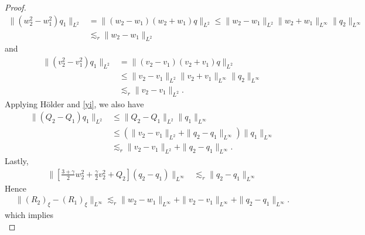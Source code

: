 \documentclass[12pt,reqno]{amsart}
\numberwithin{equation}{section}  %
\numberwithin{figure}{section}
\begin{document}
\begin{proof}
%
%
%
\begin{equation*}
\begin{split}
  \| (w_{2}^{2} - w_{1}^{2})q_{1} \|_{L^{2}}
  & = \| (w_{2} - w_{1})(w_{2} + w_{1})q \|_{L^{2}} \le \| w_{2} - w_{1} \|_{L^{2}} 
  \| w_{2} + w_{1} \|_{L^{\infty}} \| q_{2} \|_{L^{\infty}}
  \\
  & \lesssim_{r} \| w_{2} - w_{1} \|_{L^{2}}
\end{split}
\end{equation*}
%
%
and 
%
\begin{equation*}
\begin{split}
  \| (v_{2}^{2} - v_{1}^{2})q_{1} \|_{L^{2}}
  & = \| (v_{2} - v_{1})(v_{2} + v_{1})q \|_{L^{2}}
  \\
  & \le \| v_{2} - v_{1} \|_{L^{2}} 
  \| v_{2} + v_{1} \|_{L^{\infty}} \| q_{2} \|_{L^{\infty}}
  \\
  & \lesssim_{r} \| v_{2} - v_{1} \|_{L^{2}}.
\end{split}
\end{equation*}
Applying H\"older and \eqref{yi}, we also have
%
%
%
\begin{equation*}
\begin{split}
  \| (Q_{2} - Q_{1})q_{1} \|_{L^{2}} 
  & \le \| Q_{2} - Q_{1} \|_{L^{2}} \| q_{1} \|_{L^{\infty}}
  \\
  & \le (\| v_{2} - v_{1} \|_{L^{2}} + \| q_{2} - q_{1} \|_{L^{\infty}})\| q_{1} \|_{L^{\infty}}
  \\
  & \lesssim_{r} \| v_{2} - v_{1} \|_{L^{2}} + \| q_{2} - q_{1} \|_{L^{\infty}}.
\end{split}
\end{equation*}
%
%
Lastly,
%
\begin{equation*}
\begin{split}
 \| \left[
  \frac{3 + \gamma}{2} w_{2}^{2} + \frac{\gamma}{2}v_{2}^{2} + Q_{2}
  \right](q_{2} - q_{1}) \|_{L^{\infty}}
  & \lesssim_{r} \| q_{2} - q_{1} \|_{L^{\infty}} 
\end{split}
\end{equation*}
%
%
Hence
%
%
\begin{equation*}
\begin{split}
  \| (R_{2})_{\xi} - (R_{1})_{\xi} \|_{L^{\infty}} \lesssim_{r} \| w_{2} - w_{1} \|_{L^{\infty}} + \| v_{2} - v_{1} \|_{L^{\infty}}
+ \| q_{2} - q_{1} \|_{L^{\infty}}.
\end{split}
\end{equation*}
%
%
which implies
\begin{equation}
  \label{R-diff-fin-est}

\end{equation}
\end{proof}
\end{document}
